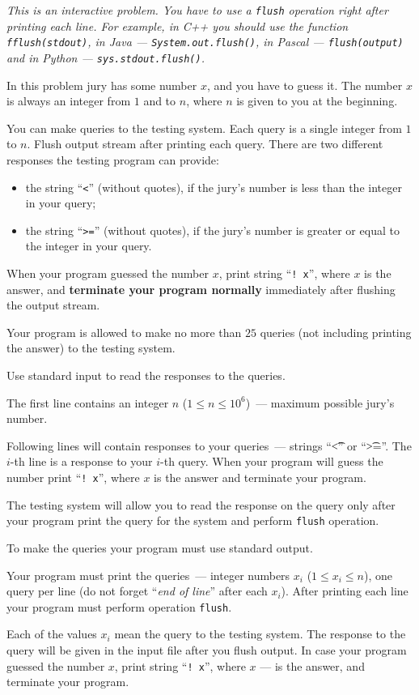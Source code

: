 \textit{This is an interactive problem. You have to use a \texttt{flush}
operation right after printing each line. For example, in C++ you should use
the function \texttt{fflush(stdout)}, in Java --- \texttt{System.out.flush()},
in Pascal --- \texttt{flush(output)} and in Python ---
\texttt{sys.stdout.flush()}.}

In this problem jury has some number $x$, and you have to guess it. The number
$x$ is always an integer from $1$ and to $n$, where $n$ is given to you at the
beginning.


You can make queries to the testing system. Each query is a single integer from
$1$ to $n$. Flush output stream after printing each query. There are two
different responses the testing program can provide:

\begin{itemize} \item the string ``\texttt{<}'' (without quotes), if the jury's
    number is less than the integer in your query; \item the string
    ``\texttt{>=}'' (without quotes), if the jury's number is greater or equal
    to the integer in your query.  \end{itemize}

When your program guessed the number $x$, print string ``\texttt{! x}'', where
$x$ is the answer, and \textbf{terminate your program normally} immediately
after flushing the output stream.

Your program is allowed to make no more than $25$ queries (not including
printing the answer) to the testing system.

\InputFile

Use standard input to read the responses to the queries.

The first line contains an integer $n$ ($1 \le n \le 10^6$)~--- maximum
possible jury's number.

Following lines will contain responses to your queries~--- strings ``\t{<}'' or
``\t{>=}''. The $i$-th line is a response to your $i$-th query. When your
program will guess the number print ``\texttt{! x}'', where $x$ is the answer
and terminate your program.

The testing system will allow you to read the response on the query only after
your program print the query for the system and perform \texttt{flush}
operation.

\OutputFile

To make the queries your program must use standard output.

Your program must print the queries~--- integer numbers $x_i$ ($1 \le x_i \le
n$), one query per line (do not forget ``\textit{end of line}'' after each
$x_i$). After printing each line your program must perform operation
\texttt{flush}.

Each of the values $x_i$ mean the query to the testing system. The response to
the query will be given in the input file after you flush output. In case your
program guessed the number $x$, print string ``\texttt{! x}'', where $x$ --- is
the answer, and terminate your program.

\SAMPLES
